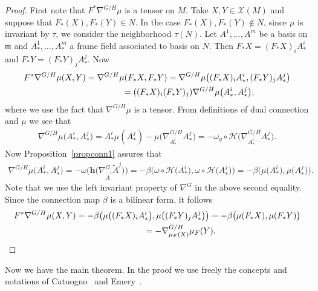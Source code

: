 \documentclass[pdftex]{sigma}
\numberwithin{equation}{section}
\newcommand{\m}{\mathfrak{m}}
\begin{document}
\begin{proof}
  First note that $F^*\nabla^{G/H}\mu$ is a tensor on $M$. Take $X, Y \in \mathcal{X}(M)$ and suppose that $F_{*}(X), F_{*}(Y) \in N$. In the case $F_{*}(X), F_{*}(Y) \notin N$, since $\mu$ is invariant by $\tau$, we consider the neighborhood $\tau(N)$. Let $A^{1}, \ldots, A^{m}$ be a basis on
  $\m$ and $A^1_*, \ldots,  A^m_*$ a frame f\/ield associated to basis on $N$. Then $F_*X = (F_*X)_{i}A^{i}_{*}$ and $F_*Y = (F_*Y)_{j}A^{j}_{*}$. Now
  \begin{gather*}
    F^*\nabla^{G/H}\mu(X, Y)
      =   \nabla^{G/H}\mu(F_*X,F_*Y)  =  \nabla^{G/H}\mu\big((F_*X)_{i}A^{i}_*,(F_*Y)_{j}A^{j}_*\big)\\
 \hphantom{F^*\nabla^{G/H}\mu(X, Y)}{} =   ((F_*X)_{i}(F_*Y)_{j})\nabla^{G/H}\mu\big(A^{i}_*,A^{j}_*\big),
  \end{gather*}
  where we use the fact that $\nabla^{G/H}\mu$ is a tensor. From def\/initions of dual connection and $\mu$ we see that
  \begin{gather*}
    \nabla^{G/H}\mu\big(A^{i}_*,A^{j}_*\big) = A^{i}_*\mu(A^{j}_*) - \mu\big(\nabla^{G/H}_{A^{i}_*}A^{j}_*\big) =
     - \omega_{g} \circ \mathcal{H} \big(\nabla^{G/H}_{A^{i}_*}A^{j}_*\big).
  \end{gather*}
  Now Proposition~\ref{propconn1} assures that
  \begin{gather*}
    \nabla^{G/H}\mu\big(A^{i}_*,A^{j}_*\big)
      =   - \omega\big( \mathbf{h}\big(\nabla^{G}_{\tilde{A}^{i}}\tilde{A}^{j}\big)\big)
      =   - \beta\big(\omega \circ \mathcal{H}\big({A}^{i}_*\big), \omega \circ \mathcal{H}\big(A^{j}_*\big)\big)
      =   - \beta\big(\mu\big({A}^{i}_*\big), \mu\big(A^{j}_*\big)\big).
  \end{gather*}
  Note that we use the left invariant property of $\nabla^{G}$ in the above second equality. Since the connection map $\beta$ is a bilinear form, it follows
  \begin{gather*}
    F^*\nabla^{G/H}\mu(X, Y)
      =   - \beta\big(\mu\big((F_*X)_{i}A^i_*\big), \mu\big((F_*Y)_{j}A^j_*\big)\big)
      =   - \beta\big(\mu(F_*X), \mu(F_*Y)\big) \\
      \hphantom{F^*\nabla^{G/H}\mu(X, Y)}{}
      =   - \nabla^{G/H}_{\mu_{F}(X)} \mu_{F}(Y) .\tag*{\qed}
  \end{gather*}
  \renewcommand{\qed}{}
\end{proof}


Now we have the main theorem. In the proof we use freely the
concepts and notations of Catuogno~\cite{Catuogno} and Emery~\cite{Emery}.
\end{document}
